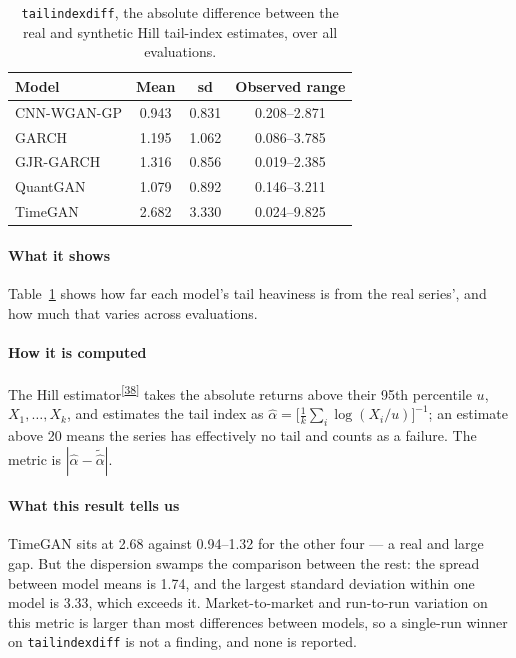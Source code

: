 \documentclass[11pt,a4paper]{article}
\makeatletter
\newcommand{\tcite}[1]{\textsuperscript{[\hyperlink{R:#1}{#1}]}}
\DeclareRobustCommand{\_}{\ifmmode\nfss@text{\textunderscore}\else\textunderscore\allowbreak\fi}
\makeatother
\begin{document}
\begin{table}[htbp]
\centering
\caption{\texttt{tail\_index\_diff}, the absolute difference between the real and synthetic Hill tail-index estimates, over all evaluations.}
\label{tab:tail}
\begin{tabular}{@{}lccc@{}}
\toprule
Model & Mean & sd & Observed range \\
\midrule
CNN-WGAN-GP & 0.943 & 0.831 & 0.208--2.871 \\
GARCH & 1.195 & 1.062 & 0.086--3.785 \\
GJR-GARCH & 1.316 & 0.856 & 0.019--2.385 \\
QuantGAN & 1.079 & 0.892 & 0.146--3.211 \\
TimeGAN & 2.682 & 3.330 & 0.024--9.825 \\
\bottomrule
\end{tabular}
\end{table}

\paragraph{What it shows} Table~\ref{tab:tail} shows how far each model's tail heaviness is from the real series', and how much that varies across evaluations.

\paragraph{How it is computed} The Hill estimator\tcite{38} takes the absolute returns above their 95th percentile $u$, $X_1,\dots,X_k$, and estimates the tail index as $\hat\alpha=\big[\frac1k\sum_i\log(X_i/u)\big]^{-1}$; an estimate above 20 means the series has effectively no tail and counts as a failure. The metric is $|\hat\alpha-\tilde{\hat\alpha}|$.

\paragraph{What this result tells us} TimeGAN sits at 2.68 against 0.94--1.32 for the other four --- a real and large gap. But the dispersion swamps the comparison between the rest: the spread between model means is 1.74, and the largest standard deviation within one model is 3.33, which exceeds it. Market-to-market and run-to-run variation on this metric is larger than most differences between models, so a single-run winner on \texttt{tail\_index\_diff} is not a finding, and none is reported.

\end{document}
